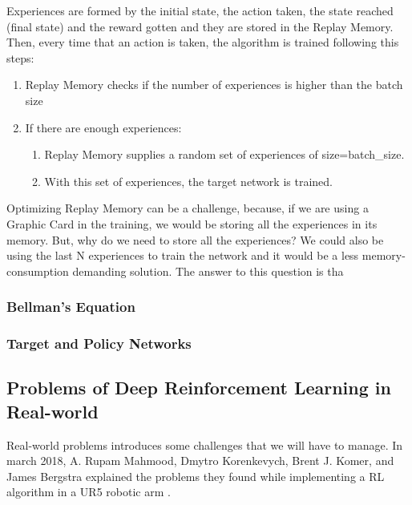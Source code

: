 			Experiences are formed by the initial state, the action taken, the state reached (final state) and the reward gotten and they are stored in the Replay Memory. Then, every time that an action is taken, the algorithm is trained following this steps:
			
			\begin{enumerate}
				\item Replay Memory checks if the number of experiences is higher than the batch size
				\item If there are enough experiences:
				\begin{enumerate}
					\item Replay Memory supplies a random set of experiences of size=batch\_size.
					\item With this set of experiences, the target network is trained.
				\end{enumerate}
			\end{enumerate}
			
			Optimizing Replay Memory can be a challenge, because, if we are using a Graphic Card in the training, we would be storing all the experiences in its memory. But, why do we need to store all the experiences? We could also be using the last N experiences to train the network and it would be a less memory-consumption demanding solution. The answer to this question is tha
		\subsubsection{Bellman's Equation}
		
		
		\subsubsection{Target and Policy Networks}
		
		
		
		
		
		
		
	\subsection{Problems of Deep Reinforcement Learning in Real-world}
		
		Real-world problems introduces some challenges that we will have to manage. In march 2018, A. Rupam Mahmood, Dmytro Korenkevych, Brent J. Komer, and James Bergstra explained the problems they found while implementing a RL algorithm in a UR5 robotic arm \cite{mahmood_setting_2018}.
		
